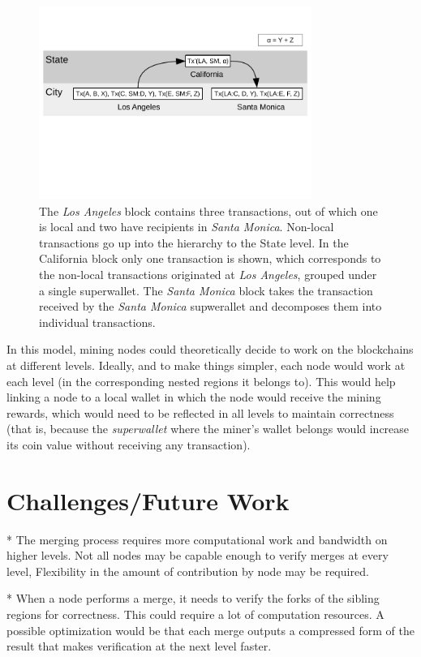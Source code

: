 \begin{figure}
\includegraphics[trim={0.1in 1.8in 0.1in 0.4in},clip,width=3.5in]{superwallet}
\caption{The \textit{Los Angeles} block contains three transactions, out of which
one is local and two have recipients in \textit{Santa Monica}.  Non-local
transactions go up into the hierarchy to the State level.  In the California
block only one transaction is shown, which corresponds to the non-local
transactions originated at \textit{Los Angeles}, grouped under a single
superwallet.  The \textit{Santa Monica} block takes the transaction received by
the \textit{Santa Monica} supwerallet and decomposes them into individual
transactions.}
\label{fig:superwallet}
\end{figure}

In this model, mining nodes could theoretically decide to work on the blockchains at
different levels.  Ideally, and to make things simpler, each node would work at
each level (in the corresponding nested regions it belongs to).  This would
help linking a node to a local wallet in which the node would receive the
mining rewards, which would need to be reflected in all levels to maintain
correctness (that is, because the \textit{superwallet} where the miner's wallet
belongs would increase its coin value without receiving any transaction).

\section{Challenges/Future Work}

* The merging process requires more computational work and bandwidth on higher
levels.  Not all nodes may be capable enough to verify merges at every level,
Flexibility in the amount of contribution by node may be required.

* When a node performs a merge, it needs to verify the forks of the sibling
regions for correctness.  This could require a lot of computation resources.  A
possible optimization would be that each merge outputs a compressed form of the
result that makes verification at the next level faster.

